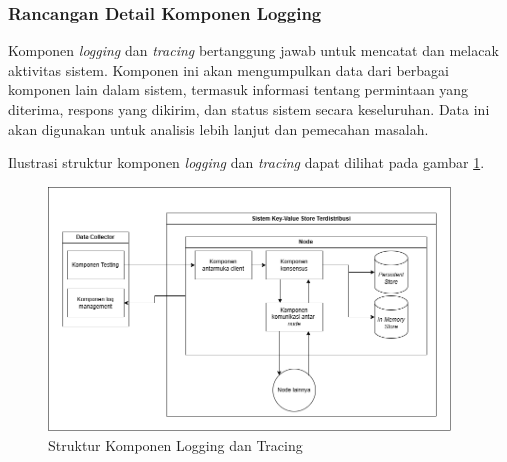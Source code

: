 \subsubsection{Rancangan Detail Komponen Logging}
\label{subsubsection:detail-data-logging}

Komponen \textit{logging} dan \textit{tracing} bertanggung jawab untuk mencatat dan melacak aktivitas sistem. Komponen ini akan mengumpulkan data dari berbagai komponen lain dalam sistem, termasuk informasi tentang permintaan yang diterima, respons yang dikirim, dan status sistem secara keseluruhan. Data ini akan digunakan untuk analisis lebih lanjut dan pemecahan masalah.

Ilustrasi struktur komponen \textit{logging} dan \textit{tracing} dapat dilihat pada gambar \ref{fig:logging-tracing-structure}.

\begin{figure}[ht]
    \centering
    \includegraphics[width=0.95\textwidth]{resources/chapter-3/general-architecture.png}
    \caption{Struktur Komponen Logging dan Tracing}
    \label{fig:logging-tracing-structure}
\end{figure}